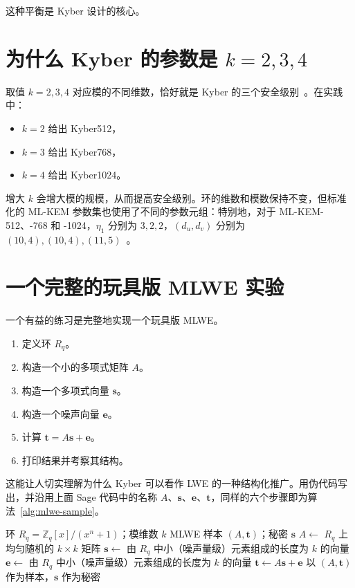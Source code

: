 这种平衡是 Kyber 设计的核心。

\section{为什么 Kyber 的参数是 $k=2,3,4$}

取值 $k=2,3,4$ 对应模的不同维数，恰好就是 Kyber 的三个安全级别~\cite{kyber2018,langlois2015}。在实践中：

\begin{itemize}
    \item $k=2$ 给出 Kyber512，
    \item $k=3$ 给出 Kyber768，
    \item $k=4$ 给出 Kyber1024。
\end{itemize}

增大 $k$ 会增大模的规模，从而提高安全级别。环的维数和模数保持不变，但标准化的 ML-KEM 参数集也使用了不同的参数元组：特别地，对于 ML-KEM-512、-768 和 -1024，$\eta_1$ 分别为 $3,2,2$，$(d_u,d_v)$ 分别为 $(10,4),(10,4),(11,5)$~\cite{fips203}。

\section{一个完整的玩具版 MLWE 实验}

一个有益的练习是完整地实现一个玩具版 MLWE。

\begin{enumerate}
    \item 定义环 $R_q$。
    \item 构造一个小的多项式矩阵 $A$。
    \item 构造一个多项式向量 $\mathbf{s}$。
    \item 构造一个噪声向量 $\mathbf{e}$。
    \item 计算 $\mathbf{t}=A\mathbf{s}+\mathbf{e}$。
    \item 打印结果并考察其结构。
\end{enumerate}

这能让人切实理解为什么 Kyber 可以看作 LWE 的一种结构化推广。用伪代码写出，并沿用上面 Sage 代码中的名称 $A$、$\mathbf{s}$、$\mathbf{e}$、$\mathbf{t}$，同样的六个步骤即为算法~\ref{alg:mlwe-sample}。

\begin{algorithm}[H]
\caption{模 LWE 样本生成}
\label{alg:mlwe-sample}
\begin{algorithmic}[1]
\Require 环 $R_q = \mathbb{Z}_q[x]/(x^n+1)$；模维数 $k$
\Ensure MLWE 样本 $(A,\mathbf{t})$；秘密 $\mathbf{s}$
\State $A \gets$ $R_q$ 上均匀随机的 $k\times k$ 矩阵
\State $\mathbf{s} \gets$ 由 $R_q$ 中小（噪声量级）元素组成的长度为 $k$ 的向量 
\State $\mathbf{e} \gets$ 由 $R_q$ 中小（噪声量级）元素组成的长度为 $k$ 的向量 
\State $\mathbf{t} \gets A\mathbf{s} + \mathbf{e}$ 
\State \Return 以 $(A,\mathbf{t})$ 作为样本，$\mathbf{s}$ 作为秘密
\end{algorithmic}
\end{algorithm}

